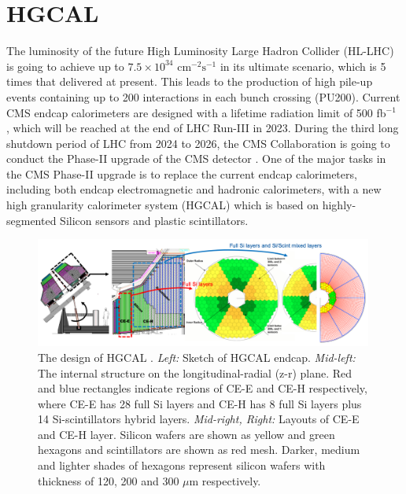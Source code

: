 
\section{HGCAL}
\label{sec:overview}


The luminosity of the future High Luminosity Large Hadron Collider (HL-LHC) is going to achieve up to $7.5\times 10^{34}$ $\text{cm}^{-2}\text{s}^{-1}$ \cite{hllhcweb} in its ultimate scenario, which is 5 times that delivered at present. This leads to the production of high pile-up events containing up to 200 interactions in each bunch crossing (PU200). Current CMS endcap calorimeters \cite{Chatrchyan:2008aa} are designed with a lifetime radiation limit of 500 fb$^{-1}$ \cite{CMSCollaboration:2015zni}, which will be reached at the end of LHC Run-III in 2023. During the third long shutdown period of LHC from 2024 to 2026, the CMS Collaboration is going to conduct the Phase-II upgrade of the CMS detector \cite{CMSCollaboration:2015zni}. One of the major tasks in the CMS Phase-II upgrade is to replace the current endcap calorimeters, including both endcap electromagnetic and hadronic calorimeters, with a new high granularity calorimeter system (HGCAL) which is based on highly-segmented Silicon sensors and plastic scintillators. 

\begin{figure}[ht]
    \centering
    \includegraphics[trim=0cm 0cm 0cm 0cm, clip,width=0.99\textwidth]{chapters/HGCal/figures/chep/hgcal2.png} 
    \caption{ The design of HGCAL \cite{Collaboration:2293646}. \emph{Left:} Sketch of HGCAL endcap. \emph{Mid-left:} The internal structure on the longitudinal-radial (z-r) plane. Red and blue rectangles indicate regions of CE-E and CE-H respectively, where CE-E has 28 full Si layers and CE-H has 8 full Si layers plus 14 Si-scintillators hybrid layers. \emph{Mid-right, Right:} Layouts of CE-E and CE-H layer. Silicon wafers are shown as yellow and green hexagons and scintillators are shown as red mesh. Darker, medium and lighter shades of hexagons represent silicon wafers with thickness of 120, 200 and 300 $\mu$m respectively.
    }
    \label{fig:hgcal}
\end{figure}

